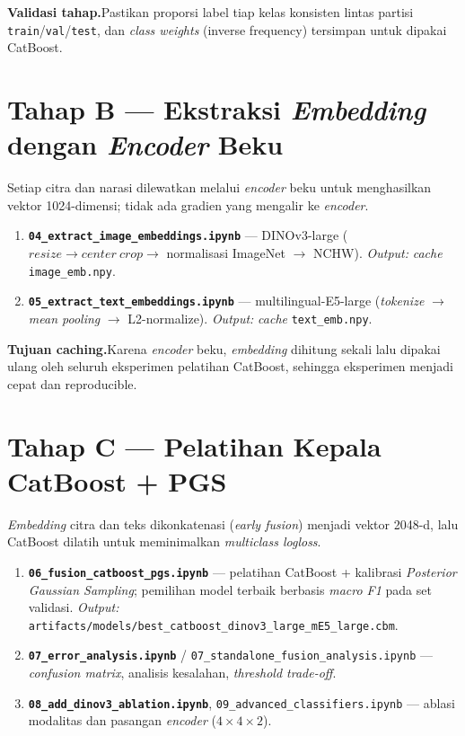 \documentclass[11pt,a4paper]{article}
\newcommand{\code}[1]{\texttt{\small #1}}
\newcommand{\stage}[2]{%
  \par\medskip\noindent\colorbox{stagebg}{\parbox{\dimexpr\linewidth-2\fboxsep}{%
  \textbf{\color{accent}#1}\;\;#2}}\par\smallskip}
\begin{document}
\stage{Validasi tahap.}{Pastikan proporsi label tiap kelas konsisten lintas partisi \code{train}/\code{val}/\code{test}, dan \emph{class weights} (inverse frequency) tersimpan untuk dipakai CatBoost.}

\section{Tahap B — Ekstraksi \emph{Embedding} dengan \emph{Encoder} Beku}
Setiap citra dan narasi dilewatkan melalui \emph{encoder} beku untuk menghasilkan
vektor 1024-dimensi; tidak ada gradien yang mengalir ke \emph{encoder}.

\begin{enumerate}[leftmargin=1.6em,itemsep=3pt]
  \item \textbf{\code{04\_extract\_image\_embeddings.ipynb}} — DINOv3-large
        ($resize \rightarrow center\ crop \rightarrow$ normalisasi ImageNet
        $\rightarrow$ NCHW). \emph{Output:} \emph{cache} \code{image\_emb.npy}.
  \item \textbf{\code{05\_extract\_text\_embeddings.ipynb}} — multilingual-E5-large
        (\emph{tokenize} $\rightarrow$ \emph{mean pooling} $\rightarrow$ L2-normalize).
        \emph{Output:} \emph{cache} \code{text\_emb.npy}.
\end{enumerate}

\stage{Tujuan caching.}{Karena \emph{encoder} beku, \emph{embedding} dihitung sekali lalu dipakai ulang oleh seluruh eksperimen pelatihan CatBoost, sehingga eksperimen menjadi cepat dan reproducible.}

\section{Tahap C — Pelatihan Kepala CatBoost + PGS}
\emph{Embedding} citra dan teks dikonkatenasi (\emph{early fusion}) menjadi vektor
2048-d, lalu CatBoost dilatih untuk meminimalkan \emph{multiclass logloss}.

\begin{enumerate}[leftmargin=1.6em,itemsep=3pt]
  \item \textbf{\code{06\_fusion\_catboost\_pgs.ipynb}} — pelatihan CatBoost +
        kalibrasi \emph{Posterior Gaussian Sampling}; pemilihan model terbaik
        berbasis \emph{macro F1} pada set validasi.
        \emph{Output:} \code{artifacts/models/best\_catboost\_dinov3\_large\_mE5\_large.cbm}.
  \item \textbf{\code{07\_error\_analysis.ipynb}} / \code{07\_standalone\_fusion\_analysis.ipynb}
        — \emph{confusion matrix}, analisis kesalahan, \emph{threshold trade-off}.
  \item \textbf{\code{08\_add\_dinov3\_ablation.ipynb}}, \code{09\_advanced\_classifiers.ipynb}
        — ablasi modalitas dan pasangan \emph{encoder} ($4\times4\times2$).
\end{enumerate}
\end{document}

